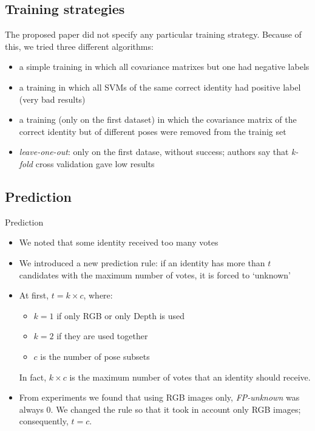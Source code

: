 \documentclass{beamer}
\begin{document}
\subsection{Training strategies}
\begin{frame}
	The proposed paper did not specify any particular training strategy.
	Because of this, we tried three different algorithms:
	\begin{itemize}
		\item a simple training in which all covariance matrixes but
			one had negative labels
		\item a training in which all SVMs of the same correct identity
			had positive label (very bad results)
		\item a training (only on the first dataset) in which the
			covariance matrix of the correct identity but of
			different poses were removed from the trainig set
		\item \textit{leave-one-out}: only on the first datase, without
			success; authors say that \textit{k-fold} cross
			validation gave low results
	\end{itemize}
\end{frame}

\subsection{Prediction}
\begin{frame}{Prediction}
	\begin{itemize}
		\item We noted that some identity received too many votes
		\item We introduced a new prediction rule: if an identity has
			more than $t$ candidates with the maximum number of
			votes, it is forced to `unknown'
		\item At first, $t=k \times c$, where:
			\begin{itemize}
				\item $k=1$ if only RGB or
					only Depth is used
				\item $k=2$ if they are used together
				\item $c$ is the number of pose subsets
			\end{itemize}
			In fact, $k \times c$ is the maximum number of votes
			that an identity should receive.
		\item From experiments we found that using RGB images only,
			\textit{FP-unknown} was always 0. We changed the rule
			so that it took in account only RGB images;
			consequently, $t = c$.

	\end{itemize}
\end{frame}
\end{document}
